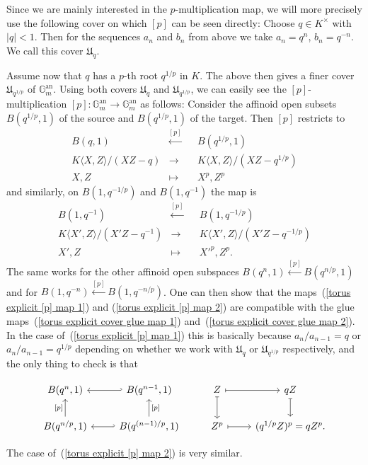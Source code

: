 \documentclass[11pt,oneside]{amsart}
\theoremstyle{definition}
\theoremstyle{remark}
\begin{document}
	Since we are mainly interested in the $p$-multiplication map, we will more precisely use the following cover on which $[p]$ can be seen directly: Choose $q\in K^\times$ with $|q|<1$. Then for the sequences $a_n$ and $b_n$ from above we take $a_n = q^n$, $b_n = q^{-n}$. 
	We call this cover $\mathfrak U_q$.
	
	Assume now that $q$ has a $p$-th root $q^{1/p}$ in $K$. The above then gives a finer cover $\mathfrak U_{q^{1/p}}$ of $\mathbb G_m^{\operatorname{an}}$. Using both covers $\mathfrak U_q$ and $\mathfrak U_{q^{1/p}}$, we can easily see the $[p]$-multiplication $[p]:\mathbb G_m^{\operatorname{an}}\rightarrow \mathbb G_m^{\operatorname{an}}$ as follows: Consider the affinoid open subsets $B(q^{1/p},1)$ of the source and  $B(q^{1/p},1)$ of the target. Then $[p]$ restricts to
	\begin{equation}
	\begin{alignedat}{2} \label{torus explicit [p] map 1}
	B(q,1)&\xleftarrow{[p]}&& B(q^{1/p},1)\\
	K\langle X,Z\rangle/(XZ-q)&\rightarrow &&K\langle X,Z\rangle/(XZ-q^{1/p})\\
	X,Z&\mapsto&& X^p, Z^p
	\end{alignedat}
	\end{equation}
	and similarly, on $B(1,q^{-1/p})$ and $B(1,q^{-1})$ the map is 
	\begin{equation}
	\begin{alignedat}{2} \label{torus explicit [p] map 2}
	B(1,q^{-1})&\xleftarrow{[p]}&& B(1,q^{-1/p})\\
	K\langle X',Z\rangle/(X'Z-q^{-1})&\rightarrow &&K\langle X',Z\rangle/(X'Z-q^{-1/p})\\
	X',Z&\mapsto&& X'^p, Z^p.
	\end{alignedat}
	\end{equation}
	The same works for the other affinoid open subspaces $B(q^{n},1)\xleftarrow{[p]} B(q^{n/p},1)$ and for $B(1,q^{-n})\xleftarrow{[p]} B(1,q^{-n/p})$.
	One can then show that the maps~(\ref{torus explicit [p] map 1}) and (\ref{torus explicit [p] map 2}) are compatible with the glue maps~(\ref{torus explicit cover glue map 1}) and~(\ref{torus explicit cover glue map 2}). In the case of~(\ref{torus explicit [p] map 1}) this is basically because $a_n/a_{n-1} = q$ or $a_n/a_{n-1}=q^{1/p}$ depending on whether we work with $\mathfrak U_q$ or $\mathfrak U_{q^{1/p}}$ respectively, and the only thing to check is that 
	\begin{center}
		\begin{equation}\label{diagram showing that [p]-multiplication on torus glues together}
		\begin{tikzcd}
			B(q^{n},1) & B(q^{n-1},1) \arrow[l, hook'] & Z \arrow[r, maps to] \arrow[d, maps to] & qZ \arrow[d, maps to] \\
			B(q^{n/p},1) \arrow[u, "{[p]}"] & B(q^{(n-1)/p},1) \arrow[u, "{[p]}"'] \arrow[l, hook'] & Z^p \arrow[r, maps to] & (q^{1/p}Z)^p=qZ^p.
		\end{tikzcd}
		\end{equation}
	\end{center} 
	The case of~(\ref{torus explicit [p] map 2}) is very similar.
	
\end{document}
